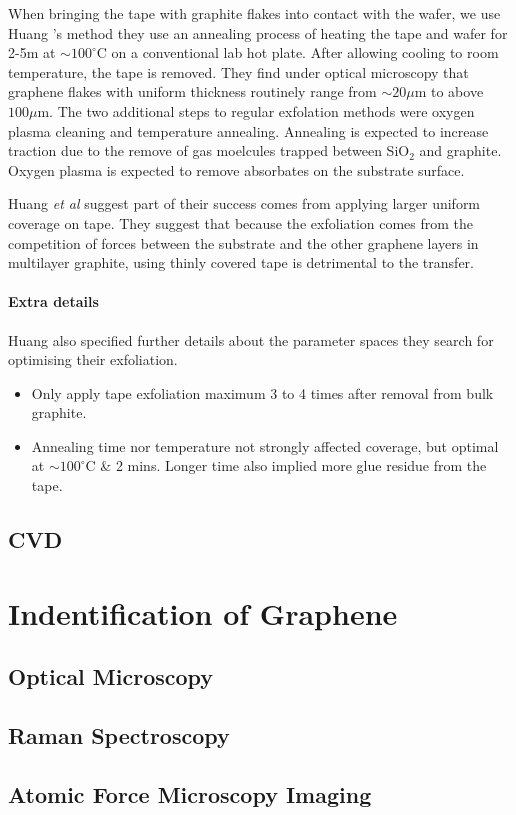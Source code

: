 \documentclass[../Matt_Gebert_Honours_Thesis.tex]{subfiles}
\begin{document}
When bringing the tape with graphite flakes into contact with the \silicondioxide wafer, we use Huang \etal's method  they  use an annealing process of heating the tape and wafer for 2-5m at $\sim 100^\circ$C on a conventional lab hot plate. After allowing cooling to room temperature, the tape is removed. They find under optical microscopy that graphene flakes with uniform thickness routinely range from $\sim 20\mu$m to above $100\mu$m. The two additional steps to regular exfolation methods were oxygen plasma cleaning and temperature annealing. Annealing is expected to increase traction due to the remove of gas moelcules trapped between SiO$_2$ and graphite. Oxygen plasma is expected to remove absorbates on the substrate surface. 

Huang \textit{et al} suggest part of their success comes from applying larger uniform coverage on tape. They suggest that because the exfoliation comes from the competition of forces between the substrate and the other graphene layers in multilayer graphite, using thinly covered tape is detrimental to the transfer.



\paragraph{Extra details} Huang \etal also specified further details about the parameter spaces they search for optimising their exfoliation. 
\begin{itemize}
	\itemsep0em 
	\item Only apply tape exfoliation maximum 3 to 4 times after removal from bulk graphite.
	\item Annealing time nor temperature not strongly affected coverage, but optimal at $\sim100^\circ$C \& 2 mins. Longer time also implied more glue residue from the tape.
\end{itemize}


\subsection{CVD}\label{sec:CVD}


\section{Indentification of Graphene}
\subsection{Optical Microscopy}

\subsection{Raman Spectroscopy}

\subsection{Atomic Force Microscopy Imaging}
\end{document}
